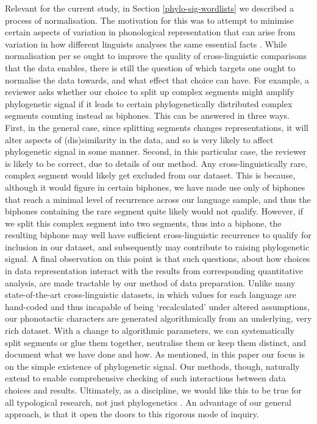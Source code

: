 Relevant for the current study, in Section \ref{phylo-sig-wordlists} we described a process of normalisation. The motivation for this was to attempt to minimise certain aspects of variation in phonological representation that can arise from variation in how different linguists analyses the same essential facts \autocites{chao_non-uniqueness_1934}{hockett_problem_1963}{hyman_universals_2008}{dresher_contrastive_2009}. While normalisation per se ought to improve the quality of cross-linguistic comparisons that the data enables, there is still the question of which targets one ought to normalise the data towards, and what effect that choice can have. For example, a reviewer asks whether our choice to split up complex segments might amplify phylogenetic signal if it leads to certain phylogenetically distributed complex segments counting instead as biphones. This can be answered in three ways. First, in the general case, since splitting segments changes representations, it will alter aspects of (dis)similarity in the data, and so is very likely to affect phylogenetic signal in some manner. Second, in this particular case, the reviewer is likely to be correct, due to details of our method. Any cross-linguistically rare, complex segment would likely get excluded from our dataset. This is because, although it would figure in certain biphones, we have made use only of biphones that reach a minimal level of recurrence across our language sample, and thus the biphones containing the rare segment quite likely would not qualify. However, if we split this complex segment into two segments, thus into a biphone, the resulting biphone may well have sufficient cross-linguistic recurrence to qualify for inclusion in our dataset, and subsequently may contribute to raising phylogenetic signal. A final observation on this point is that such questions, about how choices in data representation interact with the results from corresponding quantitative analysis, are made tractable by our method of data preparation. Unlike many state-of-the-art cross-linguistic datasets, in which values for each language are hand-coded and thus incapable of being `recalculated' under altered assumptions, our phonotactic characters are generated algorithmically from an underlying, very rich dataset. With a change to algorithmic parameters, we can systematically split segments or glue them together, neutralise them or keep them distinct, and document what we have done and how. As mentioned, in this paper our focus is on the simple existence of phylogenetic signal. Our methods, though, naturally extend to enable comprehensive checking of such interactions between data choices and results. Ultimately, as a discipline, we would like this to be true for all typological research, not just phylogenetics \autocite{round_matthew_2017}. An advantage of our general approach, is that it open the doors to this rigorous mode of inquiry.

